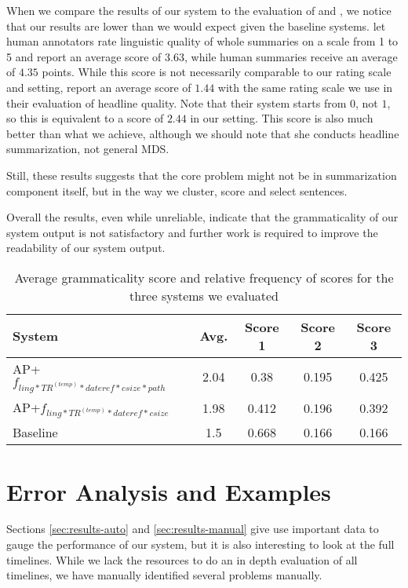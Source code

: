 \documentclass[a4paper,BCOR=10mm]{report}
\numberwithin{lemma}{chapter}
\numberwithin{definition}{chapter}
\begin{document}
When we compare the results of our system to the evaluation of \citet{banerjee} and \citet{filippova}, we notice that our results are lower than we would expect given the baseline systems. \citet{banerjee} let human annotators rate linguistic quality of whole summaries on a scale from 1 to 5 and report an average score of $3.63$, while human summaries receive an average of $4.35$ points.
While this score is not necessarily comparable to our rating scale and setting, \citet{filippova} report an average score of $1.44$ with the same rating scale we use in their evaluation of headline quality. Note that their system starts from $0$, not $1$, so this is equivalent to a score of $2.44$ in our setting. This score is also much better than what we achieve, although we should note that she conducts headline summarization, not general MDS.

Still, these results suggests that the core problem might not be in summarization component itself, but in the way we cluster, score and select sentences.

Overall the results, even while unreliable, indicate that the grammaticality of our system output is not satisfactory and further work is required to improve the readability of our system output.

\begin{table}
\begin{tabular}{|l|c|ccc|}
\hline
System & Avg. & Score 1 & Score 2 & Score 3 \\\hline
AP+$f_{ ling*TR^{(temp)}*\mathit{dateref}*\mathit{csize} * \mathit{path}}$ &  2.04 & 0.38 & 0.195 & 0.425 \\
AP+$f_{ ling*TR^{(temp)}*\mathit{dateref}*\mathit{csize}}$ & 1.98 & 0.412 & 0.196 & 0.392 \\
Baseline & 1.5 & 0.668 & 0.166 & 0.166 \\\hline
\end{tabular}

\caption{Average grammaticality score and relative frequency of scores for the three systems we evaluated}
\label{tab:results-manual}
\end{table}

\chapter{Error Analysis and Examples}  \label{sec:errors}

Sections \ref{sec:results-auto} and \ref{sec:results-manual} give use important data to gauge the performance of our system, but it is also interesting to look at the full timelines.
While we lack the resources to do an in depth evaluation of all timelines, we have manually identified several problems manually.
\end{document}
